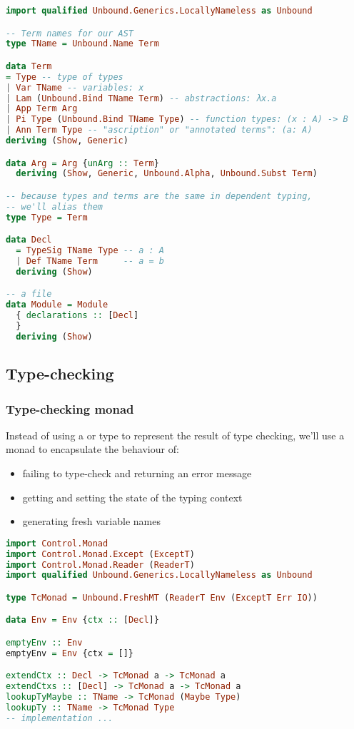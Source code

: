 \documentclass[
       embeddedlogo,
       english,
       lmodern,
       coorientadorbanca,
       noabntexcite
]{ufsc-thesis-rn46-2019}
\theoremstyle{definition}
\newcommand{\code}[1]{\text{\scpfamily\setlength\spaceskip{0.35em}#1}}
\begin{document}
\begin{lstlisting}[language=Haskell]
import qualified Unbound.Generics.LocallyNameless as Unbound

-- Term names for our AST
type TName = Unbound.Name Term

data Term
= Type -- type of types
| Var TName -- variables: x
| Lam (Unbound.Bind TName Term) -- abstractions: λx.a
| App Term Arg
| Pi Type (Unbound.Bind TName Type) -- function types: (x : A) -> B
| Ann Term Type -- "ascription" or "annotated terms": (a: A)
deriving (Show, Generic)

data Arg = Arg {unArg :: Term}
  deriving (Show, Generic, Unbound.Alpha, Unbound.Subst Term)

-- because types and terms are the same in dependent typing,
-- we'll alias them
type Type = Term

data Decl
  = TypeSig TName Type -- a : A
  | Def TName Term     -- a = b
  deriving (Show)

-- a file
data Module = Module
  { declarations :: [Decl]
  }
  deriving (Show)
\end{lstlisting}

\subsection{Type-checking}

\subsubsection{Type-checking monad}
Instead of using a \code{Maybe} or \code{Either} type to represent the result of type checking, we'll use a monad to encapsulate the behaviour of:
\begin{itemize}
       \item failing to type-check and returning an error message
       \item getting and setting the state of the typing context
       \item generating fresh variable names
\end{itemize}

\begin{lstlisting}[language=Haskell]
import Control.Monad
import Control.Monad.Except (ExceptT)
import Control.Monad.Reader (ReaderT)
import qualified Unbound.Generics.LocallyNameless as Unbound

type TcMonad = Unbound.FreshMT (ReaderT Env (ExceptT Err IO))

data Env = Env {ctx :: [Decl]}

emptyEnv :: Env
emptyEnv = Env {ctx = []}

extendCtx :: Decl -> TcMonad a -> TcMonad a
extendCtxs :: [Decl] -> TcMonad a -> TcMonad a
lookupTyMaybe :: TName -> TcMonad (Maybe Type)
lookupTy :: TName -> TcMonad Type
-- implementation ...
\end{lstlisting}
\end{document}
